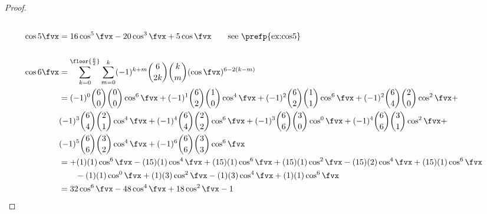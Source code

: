 \begin{proof}
\begin{align*}
\\
  \cos5\fvx
  &= 16\cos^5\fvx -20\cos^3\fvx + 5\cos\fvx \qquad\text{see \prefp{ex:cos5}} 
\\
\\
  \cos6\fvx
    &= \sum_{k=0}^\floor{\frac{6}{2}}\sum_{m=0}^k      
         (-1)^{k+m} \binom{6}{2k}\binom{k}{m}(\cos\fvx)^{6-2(k-m)}
  \\&= (-1)^0 \binom{6}{0}\binom{0}{0}\cos^6\fvx +    %
       (-1)^1 \binom{6}{2}\binom{1}{0}\cos^4\fvx +    %
       (-1)^2 \binom{6}{2}\binom{1}{1}\cos^6\fvx +    %
       (-1)^2 \binom{6}{4}\binom{2}{0}\cos^2\fvx +    %
   \\&
       (-1)^3 \binom{6}{4}\binom{2}{1}\cos^4\fvx +    %
       (-1)^4 \binom{6}{4}\binom{2}{2}\cos^6\fvx +    %
       (-1)^3 \binom{6}{6}\binom{3}{0}\cos^0\fvx +    %
       (-1)^4 \binom{6}{6}\binom{3}{1}\cos^2\fvx +    %
   \\&
       (-1)^5 \binom{6}{6}\binom{3}{2}\cos^4\fvx +    %
       (-1)^6 \binom{6}{6}\binom{3}{3}\cos^6\fvx      %
  \\&= +( 1)(1)\cos^6\fvx      %
       -(15)(1)\cos^4\fvx      %
       +(15)(1)\cos^6\fvx      %
       +(15)(1)\cos^2\fvx      %
       -(15)(2)\cos^4\fvx      %
       +(15)(1)\cos^6\fvx      %
  \\&\qquad
       -(1)(1)\cos^0\fvx       %
       +(1)(3)\cos^2\fvx       %
       -(1)(3)\cos^4\fvx       %
       +(1)(1)\cos^6\fvx       %
  \\&= 32\cos^6\fvx -48\cos^4\fvx +18\cos^2\fvx -1

\end{align*}
\end{proof}
